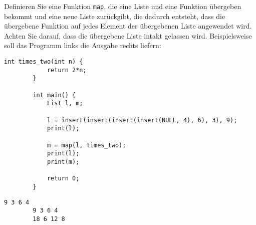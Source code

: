 \documentclass[a4paper]{article}
\begin{document}
	Definieren Sie eine Funktion \texttt{map}, die eine Liste und eine Funktion übergeben bekommt und eine neue Liste zurückgibt, die dadurch entsteht, dass die übergebene Funktion auf jedes Element der übergebenen Liste angewendet wird.
	Achten Sie darauf, dass die übergebene Liste intakt gelassen wird.
	Beispielsweise soll das Programm links die Ausgabe rechts liefern:
		
	\noindent\begin{minipage}[t][][b]{0.7\linewidth}
	\begin{lstlisting}[gobble=4]
		int times_two(int n) {
			return 2*n;
		}
		
		int main() {
			List l, m;
			
			l = insert(insert(insert(insert(NULL, 4), 6), 3), 9);
			print(l);
			
			m = map(l, times_two);
			print(l);
			print(m);
			
			return 0;
		}
	\end{lstlisting}
	\end{minipage}\qquad
	\begin{minipage}[t][][b]{0.2\linewidth}
	\begin{lstlisting}[gobble=4]
		9 3 6 4 
		9 3 6 4 
		18 6 12 8 
	\end{lstlisting}
	\end{minipage}
	
\end{document}
